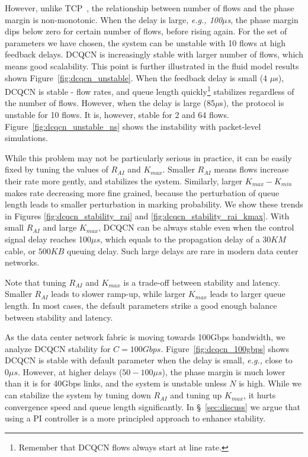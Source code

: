 However, unlike TCP~\cite{misra2000fluid}, the relationship between number of
flows and the phase margin is non-monotonic. When the delay is large, {\em e.g.,
100$\mu$s}, the phase margin dips below zero for certain number of flows, before
rising again.  For the set of parameters we have chosen, the system can be
unstable with 10 flows at high feedback delays.  DCQCN is increasingly stable
with larger number of flows, which means good scalability. This point is further
illustrated in the fluid model results shown Figure~\ref{fig:dcqcn_unstable}.
When the feedback delay is small (4 $\mu$s), DCQCN is stable - flow rates, and
queue length quickly\footnote{Remember that DCQCN flows always start at line
rate.} stabilizes regardless of the number of flows. However, when the delay is
large (85$\mu$s), the protocol is unstable for 10 flows. It is, however, stable
for 2 and 64 flows. Figure~\ref{fig:dcqcn_unstable_ns} shows the instability
with packet-level simulations.

While this problem may not be particularly serious in practice, it can be easily
fixed by tuning the values of $R_{AI}$ and $K_{max}$.  Smaller $R_{AI}$ means
flows increase their rate more gently, and stabilizes the system.  Similarly,
larger $K_{max} - K_{min}$ makes rate decreasing more fine grained, because the
perturbation of queue length leads to smaller perturbation in marking
probability.  We show these trends in Figures \ref{fig:dcqcn_stability_rai} and
\ref{fig:dcqcn_stability_rai_kmax}.  With small $R_{AI}$ and large $K_{max}$,
DCQCN can be always stable even when the control signal delay reaches 100$\mu
s$, which equals to the propagation delay of a $30KM$ cable, or $500KB$ queuing
delay. Such large delays are rare in modern data center networks. 

Note that tuning $R_{AI}$ and $K_{max}$ is a trade-off between stability and
latency. Smaller $R_{AI}$ leads to slower ramp-up, while larger $K_{max}$ leads
to larger queue length. In most cases, the default parameters strike a good
enough balance between stability and latency.

  As the data center network fabric is moving towards
100Gbps bandwidth, we analyze DCQCN stability for $C=100Gbps$.
Figure~\ref{fig:dcqcn_100gbps} shows DCQCN is stable with default parameter when
the delay is small, {\em e.g.,} close to $0\mu s$. However, at higher delays
($50-100 \mu s$), the phase margin is much lower than it is for 40Gbps links, and
the system is unstable unless $N$ is high. While we can stabilize the system by
tuning down $R_{AI}$ and tuning up $K_{max}$, it hurts convergence speed and
queue length significantly. In \S~\ref{sec:discuss} we argue that using a PI
controller is a more principled approach to enhance stability.
\fi